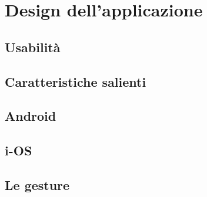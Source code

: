 \chapter{Design dell'applicazione\label{sec:design}}

\section{Usabilità\label{sec:usabilita}}

\section{Caratteristiche salienti\label{sec:caratteristiche}}

\section{Android\label{sec:android}}

\section{i-OS\label{sec:i-os}}

\section{Le gesture\label{sec:gesture}}